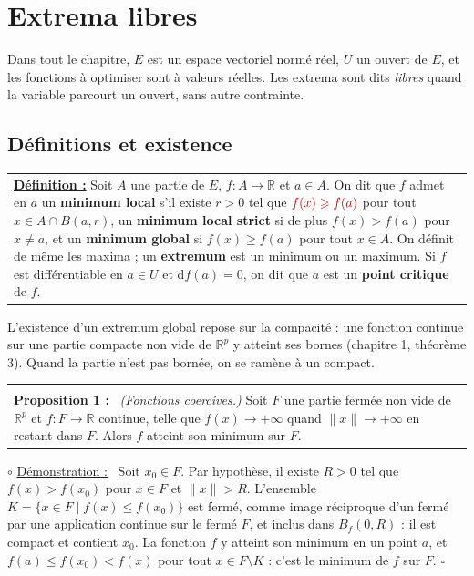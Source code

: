 \documentclass[a4paper,twoside]{report}
\makeatletter
\newcommand{\mot}[1]{\textcolor{rougecours}{\textbf{#1}}}
\newcommand{\rmath}[1]{\textcolor{rougecours}{#1}}
\newenvironment{cadre}%
 {\par\vspace{2mm}\noindent\begin{tabular}{|@{\hspace{4mm}}p{0.93\textwidth}@{\hspace{4mm}}|}
  \hline \\[-2mm]}%
 {\\[2mm] \hline \end{tabular}\par\vspace{3mm}}
\newcommand{\propo}[1]{\textbf{\underline{Proposition #1 :}}~}
\newenvironment{demo}%
 {\par\needspace{4\baselineskip}\vspace{1mm}\noindent$\circ$ \underline{Démonstration :}~\setlength{\parskip}{3pt plus 1pt}}%
 {\hfill$\square$\par\vspace{2mm}}
\newcommand{\R}{\mathbb{R}}
\newcommand{\dd}{\mathrm{d}}                      %
\newcommand{\norme}[1]{\lVert #1 \rVert}         %
\newcommand{\Bo}{B}                               %
\newcommand{\Bf}{B_{f}}                           %
\makeatother
\begin{document}
\section[Extrema libres]{Extrema libres}

Dans tout le chapitre, $E$ est un espace vectoriel normé réel, $U$ un ouvert de $E$, et les fonctions à optimiser sont à valeurs réelles. Les extrema sont dits \emph{libres} quand la variable parcourt un ouvert, sans autre contrainte.

\subsection{Définitions et existence}

\begin{center}
\begin{tabularx}{15cm}{||X}
\noindent \textbf{\underline{Définition :}} Soit $A$ une partie de $E$, $f : A \to \R$ et $a \in A$. On dit que $f$ admet en $a$ un \mot{minimum local} s'il existe $r > 0$ tel que $\rmath{f(x) \geqslant f(a)}$ pour tout $x \in A \cap \Bo(a, r)$, un \mot{minimum local strict} si de plus $f(x) > f(a)$ pour $x \neq a$, et un \mot{minimum global} si $f(x) \geqslant f(a)$ pour tout $x \in A$. On définit de même les maxima ; un \mot{extremum} est un minimum ou un maximum. Si $f$ est différentiable en $a \in U$ et $\dd f(a) = 0$, on dit que $a$ est un \mot{point critique} de $f$.
\end{tabularx}
\end{center}

\noindent L'existence d'un extremum global repose sur la compacité : une fonction continue sur une partie compacte non vide de $\R^{p}$ y atteint ses bornes (chapitre 1, théorème 3). Quand la partie n'est pas bornée, on se ramène à un compact.

\begin{cadre}
\propo{1} \emph{(Fonctions coercives.)} Soit $F$ une partie fermée non vide de $\R^{p}$ et $f : F \to \R$ continue, telle que $f(x) \to +\infty$ quand $\norme{x} \to +\infty$ en restant dans $F$. Alors $f$ atteint son minimum sur $F$.
\end{cadre}

\begin{demo}
Soit $x_{0} \in F$. Par hypothèse, il existe $R > 0$ tel que $f(x) > f(x_{0})$ pour $x \in F$ et $\norme{x} > R$. L'ensemble $K = \{x \in F \mid f(x) \leqslant f(x_{0})\}$ est fermé, comme image réciproque d'un fermé par une application continue sur le fermé $F$, et inclus dans $\Bf(0, R)$ : il est compact et contient $x_{0}$. La fonction $f$ y atteint son minimum en un point $a$, et $f(a) \leqslant f(x_{0}) < f(x)$ pour tout $x \in F \setminus K$ : c'est le minimum de $f$ sur $F$.
\end{demo}
\end{document}
